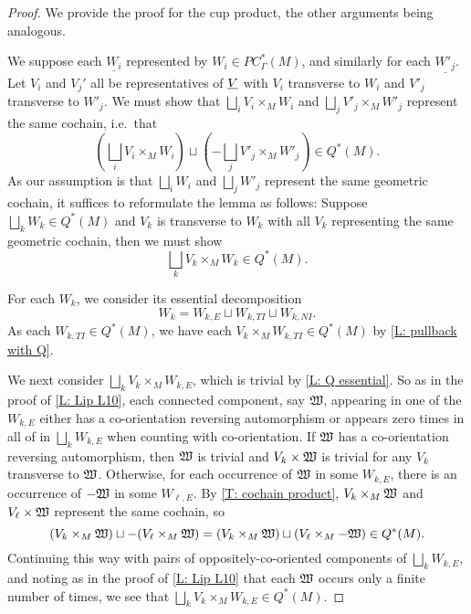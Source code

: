 \begin{proof}
	We provide the proof for the cup product, the other arguments being analogous.

	We suppose each $\underline{W_i}$ represented by $W_i \in PC^*_\Gamma(M)$, and similarly for each $\underline{W'_j}$.
	Let $V_i$ and $V_j'$ all be representatives of $\underline{V}$ with $V_i$ transverse to $W_i$ and $V'_j$ transverse to $W'_j$.
	We must show that $\bigsqcup_i V_i \times_M W_i$ and $\bigsqcup_j V'_j \times_M W'_j$ represent the same cochain, i.e.\ that $$\left(\bigsqcup_i V_i \times_M W_i\right) \sqcup \left(-\bigsqcup_j V'_j \times_M W'_j\right) \in Q^*(M).$$
	As our assumption is that $\bigsqcup_i W_i$ and $\bigsqcup_j W'_j$ represent the same geometric cochain, it suffices to reformulate the lemma as follows: Suppose $\bigsqcup_k W_k \in Q^*(M)$ and $V_k$ is transverse to $W_k$ with all $V_k$ representing the same geometric cochain, then we must show
	$$\bigsqcup_k V_k \times_M W_k \in Q^*(M).$$

	For each $W_k$, we consider its essential decomposition $$W_k = W_{k,E} \sqcup W_{k,TI} \sqcup W_{k,NI}.$$
	As each $W_{k,TI} \in Q^*(M)$, we have each $V_k \times_M W_{k,TI} \in Q^*(M)$ by \cref{L: pullback with Q}.

	We next consider $\bigsqcup_k V_k \times_M W_{k,E}$, which is trivial by \cref{L: Q essential}.
	So as in the proof of \cref{L: Lip L10}, each connected component, say $\mathfrak W$, appearing in one of the $W_{k,E}$ either has a co-orientation reversing automorphism or appears zero times in all of in $\bigsqcup_k W_{k,E}$ when counting with co-orientation.
	If $\mathfrak W$ has a co-orientation reversing automorphism, then $\mathfrak W$ is trivial and $V_k \times \mathfrak W$ is trivial for any $V_k$ transverse to $\mathfrak W$.
	Otherwise, for each occurrence of $\mathfrak W$ in some $W_{k,E}$, there is an occurrence of $-\mathfrak W$ in some $W_{\ell,E}$.
	By \cref{T: cochain product}, $V_k \times_M \mathfrak W$ and $V_\ell \times \mathfrak W$ represent the same cochain, so
	$$(V_k \times_M \mathfrak W) \sqcup -(V_\ell \times_M \mathfrak W) = (V_k \times_M \mathfrak W)\sqcup(V_\ell \times_M -\mathfrak W) \in Q^*(M).$$
	Continuing this way with pairs of oppositely-co-oriented components of $\bigsqcup_k W_{k,E}$, and noting as in the proof of \cref{L: Lip L10} that each $\mathfrak W$ occurs only a finite number of times, we see that $\bigsqcup_k V_k \times_M W_{k,E} \in Q^*(M)$.


\end{proof}
